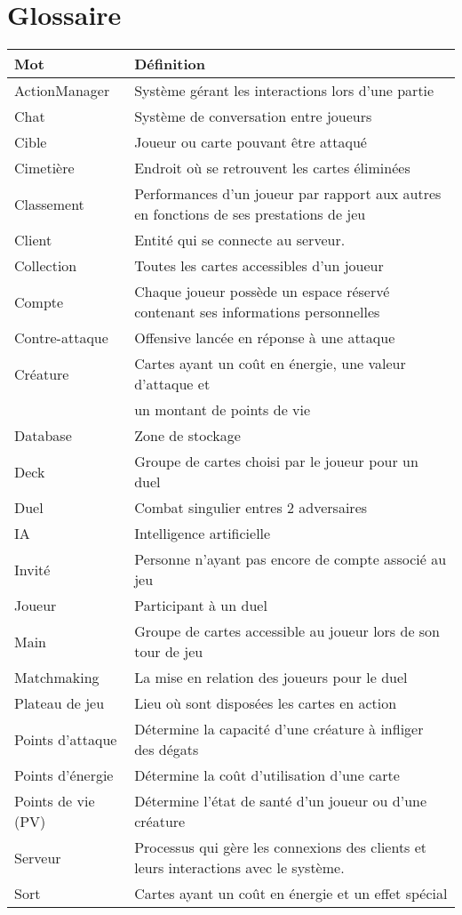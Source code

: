 \section{Glossaire}
\begin{tabular}{|l|m{10cm}|}
\hline
\textbf{Mot} & \textbf{Définition} \\
\hline
ActionManager & Système gérant les interactions lors d'une partie \\
\hline
Chat\index{chat} & Système de conversation entre joueurs \\
\hline
Cible & Joueur ou carte pouvant être attaqué \\
\hline
Cimetière\index{cimetière} & Endroit où se retrouvent les cartes éliminées \\
\hline
Classement\index{classement} & Performances d'un joueur par rapport aux autres en fonctions de ses prestations de jeu \\
\hline
Client\index{client} & Entité qui se connecte au serveur.\\
\hline
Collection\index{collection} & Toutes les cartes accessibles d'un joueur \\
\hline
Compte\index{compte} & Chaque joueur possède un espace réservé contenant ses informations personnelles\\
\hline
Contre-attaque & Offensive lancée en réponse à une attaque \\
\hline
Créature\index{créature} & Cartes ayant un coût en énergie, une valeur d'attaque et \\
&un montant de points de vie\\
\hline
Database\index{database} & Zone de stockage \\
\hline
Deck\index{deck} & Groupe de cartes choisi par le joueur pour un duel\\
\hline
Duel\index{duel} & Combat singulier entres 2 adversaires \\
\hline
IA & Intelligence artificielle \\
\hline
Invité & Personne n'ayant pas encore de compte associé au jeu \\
\hline
Joueur & Participant à un duel\\
\hline
Main & Groupe de cartes accessible au joueur lors de son tour de jeu\\
\hline
Matchmaking\index{matchmaking} & La mise en relation des joueurs pour le duel\\
\hline
Plateau de jeu & Lieu où sont disposées les cartes en action\\
\hline
Points d'attaque\index{points d'attaque} & Détermine la capacité d'une créature à infliger des dégats\\
\hline
Points d'énergie\index{points d'énergie} & Détermine la coût d'utilisation d'une carte\\
\hline
Points de vie (PV)\index{points de vie} & Détermine l'état de santé d'un joueur ou d'une créature\\
\hline
Serveur\index{serveur} & Processus qui gère les connexions des clients et leurs interactions avec le système\index{système}.\\
\hline
Sort\index{sort} & Cartes ayant un coût en énergie et un effet spécial \\
\hline
\end{tabular}